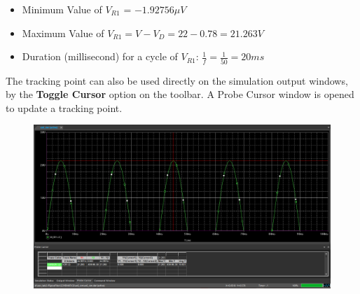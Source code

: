 \begin{itemize}
    \item Minimum Value of $V_{R1}$ = $-1.92756 \mu V$ \dotfill\\
    \item Maximum Value of $V_{R1} = V - V_D = 22 - 0.78 = 21.263V$ \dotfill\\
    \item Duration (millisecond) for a cycle of $V_{R1}$: $\frac{1}{f} = \frac{1}{50} = 20ms$ \dotfill\\
\end{itemize}

The tracking point can also be used directly on the simulation output windows, by the \textbf{Toggle Cursor} option on the toolbar. A Probe Cursor window is opened to update a tracking point.
\begin{figure}[!htp]
    \label{pic:halfwave_rectifier7}
    \centering
    \includegraphics[width = 5in]{source/picture/bai_2/ex6_plot.png}

    \label{lab02_ex031g}
\end{figure}


